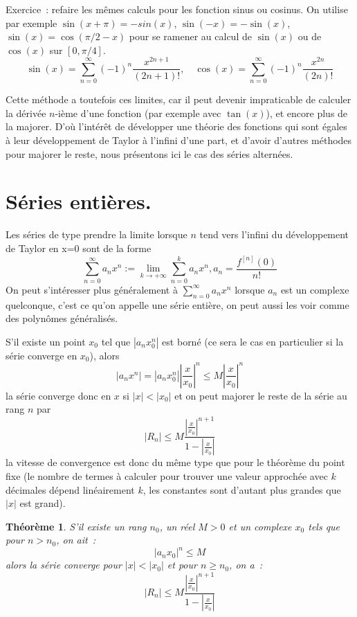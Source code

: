 \documentclass[a4paper,11pt]{book}
\newtheorem{thm}{Théorème}
\begin{document}
\begin{giacjshere}
Exercice~: refaire les mêmes calculs pour les fonction sinus ou cosinus.
On utilise par exemple $\sin(x+\pi)=-sin(x)$, $\sin(-x)=-\sin(x)$,
$\sin(x)=\cos(\pi/2-x)$ pour se ramener au calcul de $\sin(x)$ 
ou de $\cos(x)$ sur $[0,\pi/4]$.
\[ \sin(x)=\sum_{n=0}^\infty (-1)^n \frac{x^{2n+1}}{(2n+1)!},
\quad \cos(x)=\sum_{n=0}^\infty (-1)^n \frac{x^{2n}}{(2n)!} \]

Cette méthode a toutefois ces limites, car il peut devenir impraticable
de calculer la dérivée $n$-ième d'une fonction (par exemple avec $\tan(x)$),
et encore plus de la majorer. D'où l'intérêt de développer une théorie
des fonctions qui sont égales à leur développement de Taylor à l'infini
d'une part, et d'avoir d'autres méthodes pour majorer le reste, nous
présentons ici le cas des séries alternées.

\section{Séries entières.}
Les séries de type prendre la limite lorsque $n$ tend vers
l'infini du développement de Taylor en x=0 sont de la forme
\[ \sum_{n=0}^\infty a_n x^n := \lim_{ k \rightarrow +\infty} 
\sum_{n=0}^k a_n x^n, a_n=\frac{f^{[n]}(0)}{n!}
\]
On peut s'intéresser plus généralement à $\sum_{n=0}^\infty a_n x^n$
lorsque $a_n$ est un complexe quelconque, 
c'est ce qu'on appelle une série entière, on peut aussi les voir comme
des polynômes généralisés. 

S'il existe un point $x_0$ tel que 
$|a_n x_0^n|$ est born\'e (ce sera le cas en particulier 
si la s\'erie converge en $x_0$), alors
\[ |a_n x^n| = |a_n x_0^n| |\frac{x}{x_0}|^n \leq 
M |\frac{x}{x_0}|^n
\]
la s\'erie converge donc en $x$ si $|x|<|x_0|$ et on 
peut majorer le reste de la s\'erie au rang $n$ par 
\[ |R_n| \leq M \frac{ |\frac{x}{x_0}|^{n+1}} {1-|\frac{x}{x_0}|} 
\]
la vitesse de convergence est donc du m\^eme type que pour le
th\'eor\`eme du point fixe (le nombre de termes \`a calculer
pour trouver une valeur approch\'ee avec $k$ d\'ecimales 
d\'epend lin\'eairement $k$, les constantes sont d'autant
plus grandes que $|x|$ est grand).

\begin{thm}
S'il existe un rang $n_0$, un r\'eel $M>0$ et un complexe $x_0$ tels que 
pour $n>n_0$, on ait~:
\[ |a_n x_0|^n \leq M\]
alors la s\'erie converge pour $|x|<|x_0|$
et pour $n\geq n_0$, on a~:
\begin{equation} \label{eq:maj_serie_entiere}
|R_n| \leq M \frac{ |\frac{x}{x_0}|^{n+1}} {1-|\frac{x}{x_0}|} 
\end{equation}
\end{thm}


\end{giacjshere}
\end{document}
